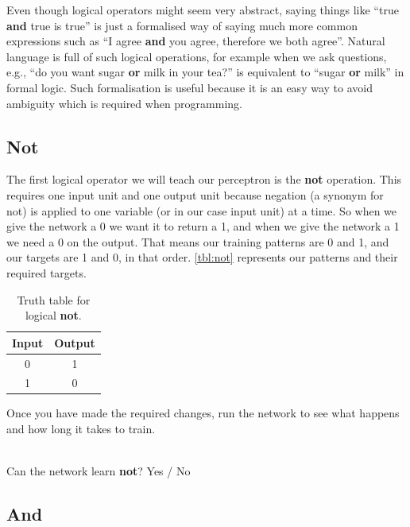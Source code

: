 \documentclass[a4paper,10pt]{article}
\begin{document}
Even though logical operators might seem very abstract, saying things like ``true \textbf{and} true is true'' is just a formalised way of saying much more common expressions such as ``I agree \textbf{and} you agree, therefore we both agree''. Natural language is full of such logical operations, for example when we ask questions, e.g., ``do you want sugar \textbf{or} milk in your tea?'' is equivalent to ``sugar \textbf{or} milk'' in formal logic. Such formalisation is useful because it is an easy way to avoid ambiguity which is required when programming.

\subsection{Not}

The first logical operator we will teach our perceptron is the \textbf{not} operation. This requires one input unit and one output unit because negation (a synonym for not) is applied to one variable (or in our case input unit) at a time. So when we give the network a 0 we want it to return a 1, and when we give the network a 1 we need a 0 on the output. That means our training patterns are 0 and 1, and our targets are 1 and 0, in that order. \autoref{tbl:not} represents our patterns and their required targets. 

\begin{table}[hb]
 \centering
 \begin{tabular}[t]{cc}
Input & Output\\ \hline
0 & 1\\
1 & 0
\end{tabular} \caption{Truth table for logical \textbf{not}.}
 \label{tbl:not}
\end{table}

Once you have made the required changes, run the network to see what happens and how long it takes to train. 

\ \\ Can the network learn \textbf{not}?    Yes / No                                               
                                                     

\subsection{And}
\end{document}
